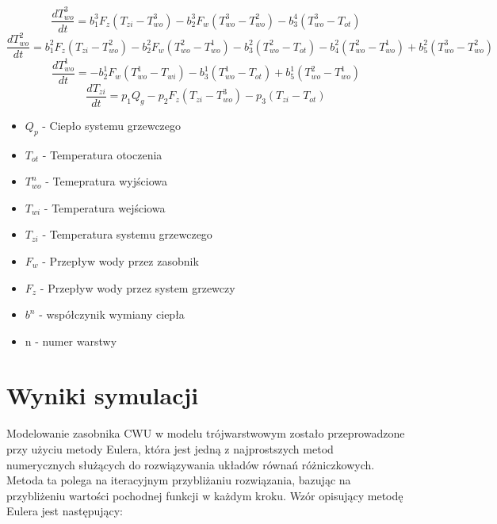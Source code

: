 \documentclass[a4paper,twoside,12pt]{book}
\begin{document}
\begin{equation}
  \frac{dT_{wo}^{3}}{dt} = b_1^3 F_z (T_{zi} - T_{wo}^{3}) - b_2^3 F_w (T_{wo}^{3} - T_{wo}^{2}) - b_3^4 (T_{wo}^{3} - T_{ot})
\end{equation}
\begin{equation}
  \frac{dT_{wo}^{2}}{dt} = b_1^2 F_z (T_{zi} - T_{wo}^{2}) - b_2^2 F_w (T_{wo}^{2} - T_{wo}^{1}) - b_3^2 (T_{wo}^{2} - T_{ot}) - b_4^2 (T_{wo}^{2} - T_{wo}^{1}) + b_5^2 (T_{wo}^{3} - T_{wo}^{2})
\end{equation}
\begin{equation}
  \frac{dT_{wo}^{1}}{dt} = -b_2^1 F_w (T_{wo}^{1} - T_{wi}) - b_3^1 (T_{wo}^{1} - T_{ot}) + b_5^1 (T_{wo}^{2} - T_{wo}^{1})
\end{equation}
\begin{equation}
  \frac{dT_{zi}}{dt} = p_1 Q_g - p_2 F_z (T_{zi} - T_{wo}^{3}) - p_3 (T_{zi} - T_{ot})
\end{equation}

\begin{itemize}
  \item $Q_p$ - Ciepło systemu grzewczego
  \item $T_{ot}$ - Temperatura otoczenia
  \item $T_{wo}^n$ - Temepratura wyjściowa
  \item $T_{wi}$ - Temperatura wejściowa
  \item $T_{zi}$ - Temperatura systemu grzewczego
  \item $F_{w}$ - Przepływ wody przez zasobnik
  \item $F_{z}$ - Przepływ wody przez system grzewczy
  \item $b^n$ - współczynik wymiany ciepła
  \item n - numer warstwy
\end{itemize}


\newpage
\section{Wyniki symulacji}
Modelowanie zasobnika CWU w modelu trójwarstwowym zostało przeprowadzone przy użyciu metody Eulera, która jest jedną z najprostszych metod numerycznych służących do rozwiązywania układów równań różniczkowych. Metoda ta polega na iteracyjnym przybliżaniu rozwiązania, bazując na przybliżeniu wartości pochodnej funkcji w każdym kroku.
Wzór opisujący metodę Eulera jest następujący:
\end{document}
